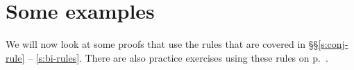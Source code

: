 

\section{Some examples}

We will now look at some proofs that use the rules that are covered in \S\S \ref{s:conj-rule} -- \ref{s:bi-rules}. There are also practice exercises using these rules on p.~\pageref{practice-proofs-1}. 

